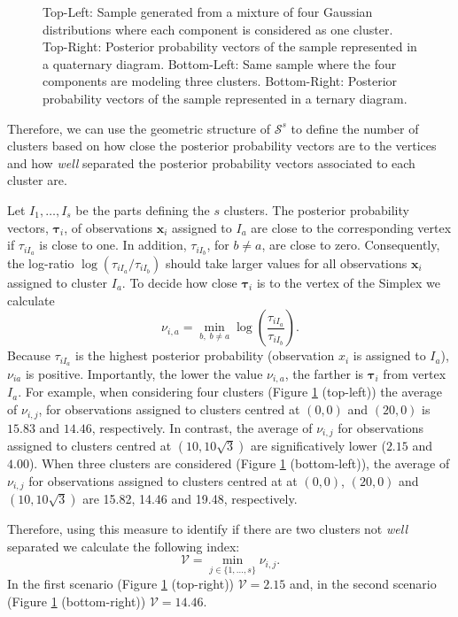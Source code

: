 \documentclass[submit]{smj}
\theoremstyle{definition}
\newcommand{\m}[1]{\boldsymbol{#1}}
\begin{document}
\begin{figure}[thbp]
\begin{center}
\begin{tabular}{cc}
 \end{tabular}
 \caption{Top-Left: Sample generated from a mixture of four Gaussian distributions where each component is considered as one cluster. Top-Right: Posterior probability vectors of the sample represented in a quaternary diagram. Bottom-Left: Same sample where the four components are modeling three clusters. Bottom-Right: Posterior probability vectors of the sample represented in a ternary diagram.}\label{cluster_post}
\end{center}
\end{figure}

Therefore, we can use the geometric structure of $\mathcal{S}^s$ \citep{PE2001geo} to define the number of clusters based on how close the posterior probability vectors are to the vertices and how \emph{well} separated the posterior probability vectors associated to each cluster are.

Let $I_1,\dots, I_s$ be the parts defining the $s$ clusters. The posterior probability vectors, $\m\tau_i$, of observations $\m x_i$ assigned to $I_a$ are close to the corresponding vertex if $\tau_{i I_a}$ is close to one. In addition, $\tau_{i I_b}$, for $b \neq a$, are close to zero. Consequently, the log-ratio $\log(\tau_{i I_a}/\tau_{iI_b})$ should take larger values for all observations $\m x_i$ assigned to cluster $I_a$. To decide how close $\m\tau_i$ is to the vertex of the Simplex we calculate
\[
\nu_{i, a} = \min_{b,\;b \neq a}  \log(\frac{\tau_{i I_a}}{\tau_{iI_b}}).
\]
Because $\tau_{i I_a}$ is the highest posterior probability (observation $x_i$ is assigned to $I_a$), $\nu_{i a}$ is positive. Importantly, the lower the value $\nu_{i, a}$, the farther is $\m\tau_{i}$ from vertex $I_a$. For example, when considering four clusters (Figure \ref{cluster_post} (top-left)) the average of $\nu_{i, j}$, for observations assigned to clusters centred  at $(0,0)$ and $(20, 0)$ is $15.83$ and $14.46$, respectively. In contrast, the average of $\nu_{i, j}$ for observations assigned to clusters centred at $(10, 10\sqrt{3})$ are significatively lower ($2.15$ and $4.00$). When three clusters are considered (Figure \ref{cluster_post} (bottom-left)), the average of $\nu_{i, j}$ for observations assigned to clusters centred at at $(0,0)$, $(20, 0)$ and $(10, 10\sqrt{3})$ are 15.82, 14.46 and 19.48, respectively. 

Therefore, using this measure to identify if there are two clusters not \emph{well} separated we calculate the following index:
\[
\mathcal{V} = \min_{j \in \{1,\dots, s\}} \nu_{i, j}.
\]
In the first scenario (Figure \ref{cluster_post} (top-right)) $\mathcal{V} = 2.15$ and, in the second scenario (Figure \ref{cluster_post} (bottom-right)) $\mathcal{V} = 14.46$.
\end{document}
